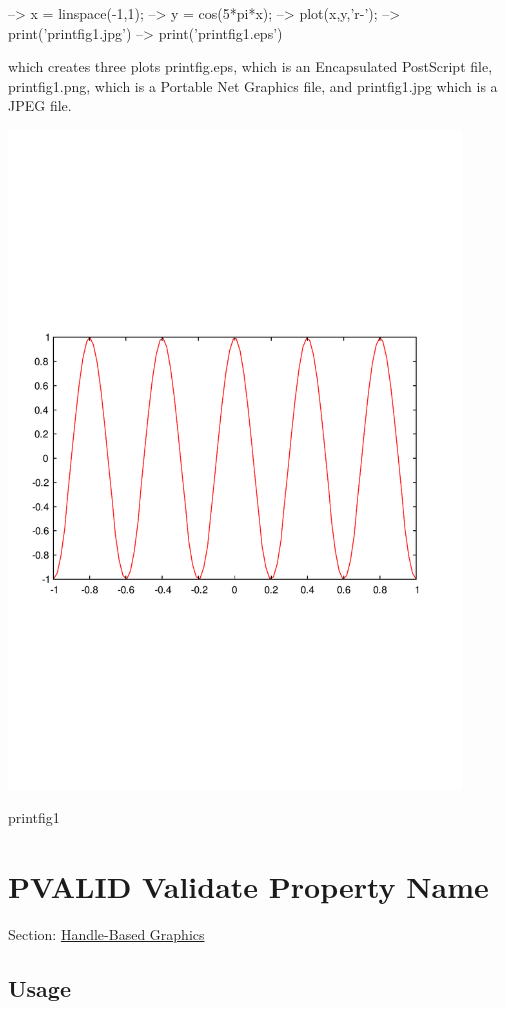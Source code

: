 \begin{DoxyVerbInclude}
--> x = linspace(-1,1);
--> y = cos(5*pi*x);
--> plot(x,y,'r-');
--> print('printfig1.jpg')
--> print('printfig1.eps')
\end{DoxyVerbInclude}


which creates three plots {\ttfamily printfig.\-eps}, which is an Encapsulated Post\-Script file, {\ttfamily printfig1.\-png}, which is a Portable Net Graphics file, and {\ttfamily printfig1.\-jpg} which is a J\-P\-E\-G file.  
\begin{DoxyImage}
\includegraphics[width=12cm]{printfig1}
\caption{printfig1}
\end{DoxyImage}
 \hypertarget{handle_pvalid}{}\section{P\-V\-A\-L\-I\-D Validate Property Name}\label{handle_pvalid}
Section\-: \hyperlink{sec_handle}{Handle-\/\-Based Graphics} \hypertarget{vtkwidgets_vtkxyplotwidget_Usage}{}\subsection{Usage}\label{vtkwidgets_vtkxyplotwidget_Usage}
